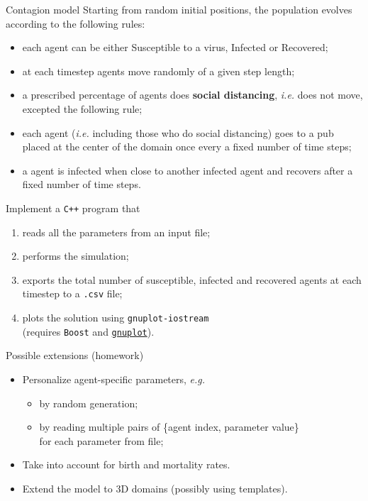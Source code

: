 \documentclass[10pt]{beamer}
\begin{document}
\begin{frame}{Contagion model}
Starting from random initial positions, the population evolves according to the following rules:

\begin{itemize}
    \item each agent can be either Susceptible to a virus, Infected or Recovered;
    \item at each timestep agents move randomly of a given step length;
    \item a prescribed percentage of agents does \textbf{social distancing}, \textit{i.e.} does not move, excepted the following rule;
    \item each agent (\textit{i.e.} including those who do social distancing) goes to a pub placed at the center of the domain once every a fixed number of time steps;
    \item a agent is infected when close to another infected agent and recovers after a fixed number of time steps.
\end{itemize}
\pause
Implement a \texttt{C++} program that
\begin{enumerate}
    \item reads all the parameters from an input file;
    \item performs the simulation;
    \item exports the total number of susceptible, infected and recovered agents at each timestep to a \texttt{.csv} file;
    \item plots the solution using \texttt{gnuplot-iostream}\\
          (requires \texttt{Boost} and \href{http://www.gnuplot.info/download.html}{\texttt{gnuplot}}).
\end{enumerate}
\end{frame}

\begin{frame}{Possible extensions (homework)}
\begin{itemize}
    \item Personalize agent-specific parameters, \textit{e.g.}
    \begin{itemize}
        \item by random generation;
        \item by reading multiple pairs of \{agent index, parameter value\}\\
              for each parameter from file;
    \end{itemize}
    \item Take into account for birth and mortality rates.
    \item Extend the model to 3D domains (possibly using templates).
\end{itemize}
\end{frame}
\end{document}
